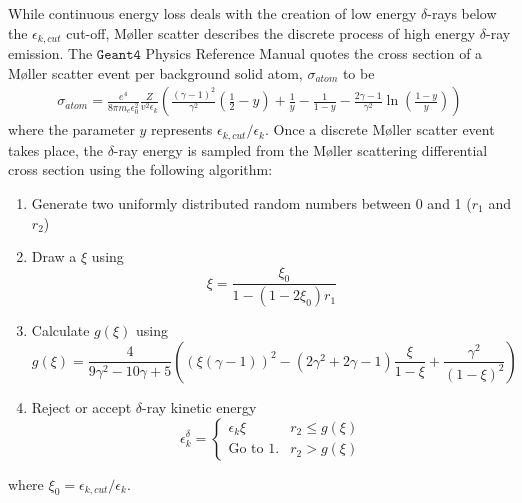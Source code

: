 \documentclass[12pt]{article}
\numberwithin{equation}{section}
\begin{document}
While continuous energy loss deals with the creation of low energy $\delta$-rays below the $\epsilon_{k,cut}$ cut-off, M\o{}ller scatter describes the discrete process of high energy $\delta$-ray emission. The $\texttt{Geant4}$ Physics Reference Manual \cite{code:geant4:physRefMan} quotes the cross section of a M\o{}ller scatter event per background solid atom, $\sigma_{atom}$ to be
%
\begin{align} \label{eq:ionisation:cross_sec}
  \sigma_{atom} = \frac{e^4}{8\pi m_e\epsilon_0^2}\frac{Z}{v^2\epsilon_k}\left(\frac{(\gamma-1)^2}{\gamma^2}\left(\frac{1}{2} - y\right) + \frac{1}{y} - \frac{1}{1-y} - \frac{2\gamma - 1}{\gamma^2}\ln\left(\frac{1-y}{y}\right)\right)
\end{align}
%
where the parameter $y$ represents $\epsilon_{k,cut}/\epsilon_k$. Once a discrete M\o{}ller scatter event takes place, the $\delta$-ray energy is sampled from the M\o{}ller scattering differential cross section using the following algorithm:
%
\begin{enumerate}
  \item Generate two uniformly distributed random numbers between 0 and 1 ($r_{1}$ and $r_{2}$)
  \item Draw a $\xi$ using $$\xi = \frac{\xi_0}{1-(1-2\xi_0)r_{1}}$$
  \item Calculate $g(\xi)$ using $$g(\xi)=\frac{4}{9\gamma^2-10\gamma+5}\left((\xi(\gamma-1))^2 - (2\gamma^2 + 2\gamma - 1)\frac{\xi}{1-\xi} + \frac{\gamma^2}{(1-\xi)^2}\right)$$
  \item Reject or accept $\delta$-ray kinetic energy 
  $$\epsilon_k^\delta = \begin{cases} \epsilon_k\xi & r_{2} \leq g(\xi) \\ \text{Go to 1.} & r_2 > g(\xi) \end{cases}$$
\end{enumerate}
%
where $\xi_0=\epsilon_{k,cut}/\epsilon_k$.
\end{document}
